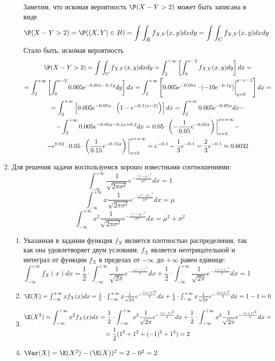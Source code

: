 \begin{enumerate}
\begin{enumerate}
Заметим, что искомая вероятность  $\P(X-Y > 2)$ может быть записана в виде
\[
\P(X-Y > 2) = \P((X, Y) \in B ) = \int \int_B f_{X, Y} (x, y) dx dy = \int \int_C f_{X, Y} (x, y) dx dy
\]
Стало быть, искомая вероятность
\begin{multline*}
\P(X-Y > 2) = \int \int_C f_{X, Y} (x, y) dx dy = \int_{2}^{+\infty} \left[ \int_{0}^{x-2} f_{X, Y} (x, y) dy \right] dx =\\
= \int_{2}^{+\infty} \left[ \int_{0}^{x-2} 0.005e^{-0.05x-0.1y}dy \right] dx
= \int_{2}^{+\infty} \left[ 0.005e^{-0.05x} \cdot (-10e^{-0.1y}) \bigg\vert_{y=0}^{y=x-2} \right] dx = \\
=  \int_{2}^{+\infty} \left[ 0.005e^{-0.05x} \cdot\left(1-e^{-0.1(x-2)}  \right) \right] dx  = \int_{2}^{+\infty} 0.005e^{-0.05x} dx - \\
- \int_{2}^{+\infty} 0.005e^{-0.05x-0.1x+0.2} dx
= 0.05 \cdot \left( -\frac{1}{0.05}e^{-0.05x}  \right) \bigg\vert_{x=2}^{x=+\infty} - \\
- e^{0.02} \cdot 0.05 \cdot \left( \frac{1}{0.15} e^{-0.15x} \right) \bigg\vert_{x=2}^{x=+\infty}
= e^{-0.1} -\frac{1}{3} e^{-0.1} = \frac{2}{3}e^{-0.1}  \approx 0.6032
\end{multline*}
\end{enumerate}
\item Для решения задачи воспользуемся хорошо известными соотношениями:
\[
\int_{-\infty}^{+\infty} \frac{1}{\sqrt{2\pi\sigma^2}} e^{-\frac{(x-\mu)^2}{2\sigma^2}} dx = 1
\]
\[
\int_{-\infty}^{+\infty} x\frac{1}{\sqrt{2\pi\sigma^2}} e^{-\frac{(x-\mu)^2}{2\sigma^2}} dx = \mu
\]
\[
\int_{-\infty}^{+\infty} x^2 \frac{1}{\sqrt{2\pi\sigma^2}} e^{-\frac{(x-\mu)^2}{2\sigma^2}} dx = \mu^2 + \sigma^2
\]
\begin{enumerate}
\item Указанная в задании функция $f_X$ является плотностью распределения, так как она удовлетворяет двум условиям:  $f_X$ является неотрицательной и интеграл от функции $f_X$ в пределах от  $-\infty$ до $+\infty$ равен единице:
\[
\int_{-\infty}^{+\infty} f_X (x) dx = \frac{1}{2} \cdot \int_{-\infty}^{+\infty}  \frac{1}{\sqrt{2\pi}} e^{-\frac{(x-1)^2}{2}} dx  + \frac{1}{2} \cdot \int_{-\infty}^{+\infty}  \frac{1}{\sqrt{2\pi}} e^{-\frac{(x+1)^2}{2}} dx = 1
\]
\item $\E(X) =\int_{-\infty}^{+\infty} xf_X (x) dx =  \frac{1}{2} \cdot \int_{-\infty}^{+\infty} x \frac{1}{\sqrt{2\pi}} e^{-\frac{(x-1)^2}{2}} dx  + \frac{1}{2} \cdot \int_{-\infty}^{+\infty}  x \frac{1}{\sqrt{2\pi}} e^{-\frac{(x+1)^2}{2}} dx = 1- 1=  0$
\item  \begin{multline*}
\E(X^2) = \int_{-\infty}^{+\infty} x^2 f_X (x) dx  =  \frac{1}{2} \cdot \int_{-\infty}^{+\infty} x^2 \frac{1}{\sqrt{2\pi}} e^{-\frac{(x-1)^2}{2}} dx  + \frac{1}{2}  \cdot \int_{-\infty}^{+\infty} x^2 \frac{1}{\sqrt{2\pi}} e^{-\frac{(x+1)^2}{2}} dx = \\
= \frac{1}{2}(1^2 + 1^2 + (-1)^2 + 1^2) =  2
\end{multline*}
\item $\Var(X) = \E(X^2) - (\E(X))^2 = 2 - 0^2 = 2$
\end{enumerate}
\end{enumerate}

